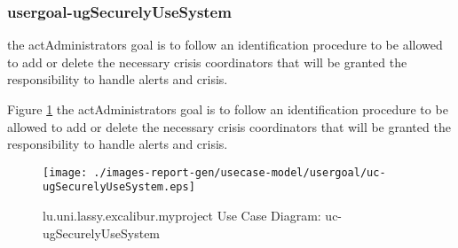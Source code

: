 \subsubsection{usergoal-ugSecurelyUseSystem}

\label{RE-use-case-ugSecurelyUseSystem}


the actAdministrators goal is to follow an identification procedure to be allowed to add or delete the
necessary crisis coordinators that will be granted the responsibility to handle alerts and crisis.		  


\begin{usecase}
  











\end{usecase} 


Figure \ref{fig:lu.uni.lassy.excalibur.myproject-RE-UCD-uc-ugSecurelyUseSystem}
the actAdministrators goal is to follow an identification procedure to be allowed to add or delete the
necessary crisis coordinators that will be granted the responsibility to handle alerts and crisis.

\begin{figure}[htbp]
\begin{center}

\texttt{[image: ./images-report-gen/usecase-model/usergoal/uc-ugSecurelyUseSystem.eps]}
\end{center}
\caption[lu.uni.lassy.excalibur.myproject Use Case Diagram: uc-ugSecurelyUseSystem]{lu.uni.lassy.excalibur.myproject Use Case Diagram: uc-ugSecurelyUseSystem}
\label{fig:lu.uni.lassy.excalibur.myproject-RE-UCD-uc-ugSecurelyUseSystem}
\end{figure}
\vspace{0.5cm}
